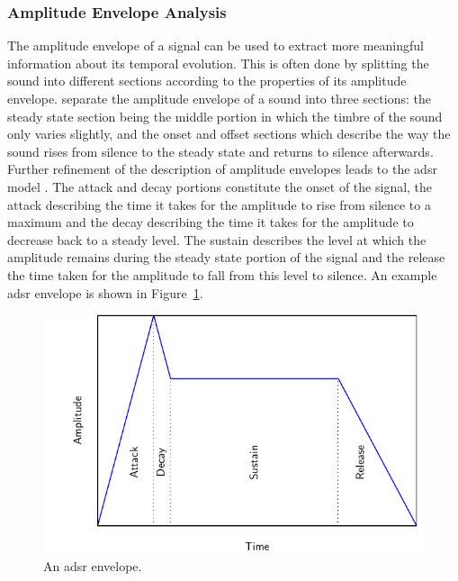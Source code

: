 		\subsubsection*{Amplitude Envelope Analysis}
			The amplitude envelope of a signal can be used to extract more meaningful information about its
			temporal evolution. This is often done by splitting the sound into different sections according to
			the properties of its amplitude envelope. \citet{howard2009acoustics} separate the amplitude
			envelope of a sound into three sections: the steady state section being the middle portion in which
			the timbre of the sound only varies slightly, and the onset and offset sections which describe the
			way the sound rises from silence to the steady state and returns to silence afterwards. Further
			refinement of the description of amplitude envelopes leads to the \acrfull{adsr} model
			\citep{descrivan2012music}. The attack and decay portions constitute the onset of the signal, the
			attack describing the time it takes for the amplitude to rise from silence to a maximum and the
			decay describing the time it takes for the amplitude to decrease back to a steady level. The
			sustain describes the level at which the amplitude remains during the steady state portion of the
			signal and the release the time taken for the amplitude to fall from this level to silence. An
			example \acrshort{adsr} envelope is shown in Figure~\ref{fig:ADSR}.

			\begin{figure}[h!]
				\centering
				\includegraphics{chapter2/Images/ADSR.pdf}
				\caption{An \acrshort{adsr} envelope.}
				\label{fig:ADSR}
			\end{figure}

